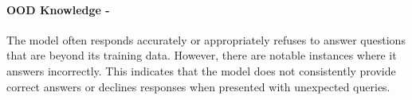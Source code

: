\paragraph{OOD Knowledge - \moderate}
The model often responds accurately or appropriately refuses to answer questions that are beyond its training data. However, there are notable instances where it answers incorrectly. This indicates that the model does not consistently provide correct answers or declines responses when presented with unexpected queries.
